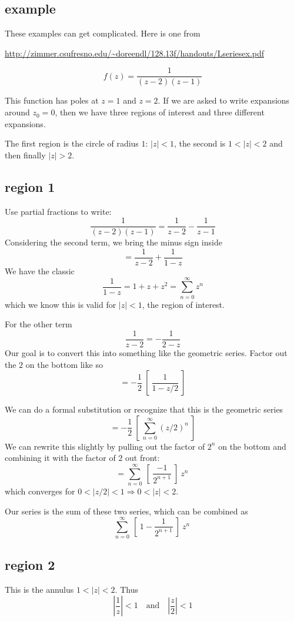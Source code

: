 \documentclass[11pt, oneside]{article}
\begin{document}
\subsection*{example}
These examples can get complicated.  Here is one from

\url{http://zimmer.csufresno.edu/~doreendl/128.13f/handouts/Lseriesex.pdf}

\[ f(z) = \frac{1}{(z-2)(z-1)} \]

This function has poles at $z = 1$ and $z = 2$.  If we are asked to write expansions around $z_0 = 0$, then we have three regions of interest and three different expansions.

The first region is the circle of radius $1$:  $|z| < 1$, the second is $1 < |z| < 2$ and then finally $|z| > 2$.

\subsection*{region 1}
Use partial fractions to write:
\[ \frac{1}{(z-2)(z-1)} = \frac{1}{z-2} - \frac{1}{z-1} \]
Considering the second term, we bring the minus sign inside
\[ = \frac{1}{z-2} + \frac{1}{1-z} \]
We have the classic
\[ \frac{1}{1-z} = 1 + z + z^2 = \sum_{n=0}^{\infty} z^n \]
which we know this is valid for $|z| < 1$, the region of interest.

For the other term
\[ \frac{1}{z - 2} = - \frac{1}{2 - z} \]
Our goal is to convert this into something like the geometric series.  Factor out the $2$ on the bottom like so
\[ = - \frac{1}{2} \ [ \  \frac{1}{1 - z/2} \ ]  \]

We can do a formal substitution or recognize that this is the geometric series 
\[ = - \frac{1}{2} \ [ \   \sum_{n=0}^{\infty} (z/2)^n \ ]  \]
We can rewrite this slightly by pulling out the factor of $2^n$ on the bottom and combining it with the factor of $2$ out front:
\[ = \sum_{n=0}^{\infty} \ [ \ \frac{-1}{2^{n+1}} \ ] \  z^n \  \]
which converges for $0 < |z/2| < 1 \Rightarrow 0 < |z| < 2$.

Our series is the sum of these two series, which can be combined as
\[ \sum_{n=0}^{\infty} \ [ \ 1 - \frac{1}{2^{n+1}} \ ] \  z^n \  \]

\subsection*{region 2}
This is the annulus $1 < |z| < 2$.  Thus
\[ | \frac{1}{z} | < 1 \  \ \ \text{ and } \ \ \  |\frac{z}{2} | < 1 \]
\end{document}
